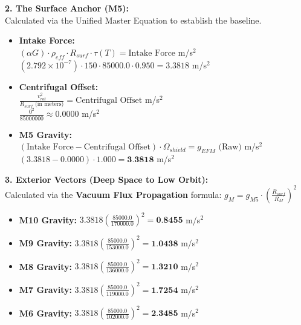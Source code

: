 \documentclass[11pt, a4paper]{article}
\begin{document}
  \vspace{1.0em}
  \noindent \textbf{2. The Surface Anchor (M5):} \\
  \hspace*{1em} Calculated via the Unified Master Equation to establish the baseline.
  \begin{itemize}
    \item \textbf{Intake Force:} \\[0.5em]
    \hspace*{2em} $(\alpha G) \cdot \rho_{eff} \cdot R_{surf} \cdot \tau(T) = \text{Intake Force}$ m/s$^2$ \\[1em]
    \hspace*{2em} $(2.792 \times 10^{-7}) \cdot 150 \cdot 85000.0 \cdot 0.950 = 3.3818$ m/s$^2$
    
    \item \textbf{Centrifugal Offset:} \\[0.5em]
    \hspace*{2em} $\frac{v_{rot}^2}{R_{surf} \text{ (in meters)}} = \text{Centrifugal Offset}$ m/s$^2$ \\[1em]
    \hspace*{2em} $\frac{0^2}{85000000} \approx 0.0000$ m/s$^2$
    
    \item \textbf{M5 Gravity:} \\[0.5em]
    \hspace*{2em} $(\text{Intake Force} - \text{Centrifugal Offset}) \cdot \Omega_{shield} = g_{EFM} \text{ (Raw)}$ m/s$^2$ \\[1em]
    \hspace*{2em} $(3.3818 - 0.0000) \cdot 1.000 = \textbf{3.3818}$ m/s$^2$
  \end{itemize}

  \clearpage
  \noindent \textbf{3. Exterior Vectors (Deep Space to Low Orbit):} \\
  \hspace*{1em} Calculated via the \textbf{Vacuum Flux Propagation} formula: $g_M = g_{M5} \cdot \left( \frac{R_{surf}}{R_M} \right)^2$
  \begin{itemize}
    \item \textbf{M10 Gravity:} $3.3818 \left( \frac{85000.0}{170000.0} \right)^2 = \textbf{0.8455}$ m/s$^2$
    \item \textbf{M9 Gravity:} $3.3818 \left( \frac{85000.0}{153000.0} \right)^2 = \textbf{1.0438}$ m/s$^2$
    \item \textbf{M8 Gravity:} $3.3818 \left( \frac{85000.0}{136000.0} \right)^2 = \textbf{1.3210}$ m/s$^2$
    \item \textbf{M7 Gravity:} $3.3818 \left( \frac{85000.0}{119000.0} \right)^2 = \textbf{1.7254}$ m/s$^2$
    \item \textbf{M6 Gravity:} $3.3818 \left( \frac{85000.0}{102000.0} \right)^2 = \textbf{2.3485}$ m/s$^2$
  \end{itemize}
\end{document}
